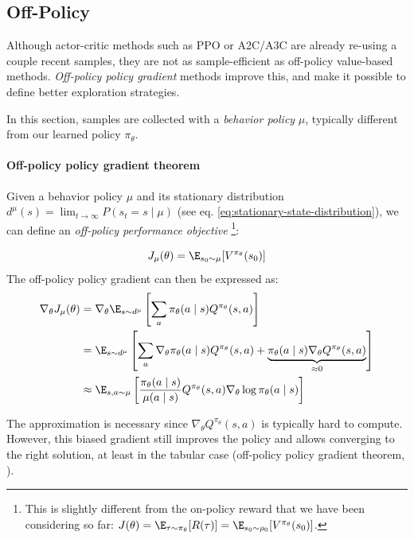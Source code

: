 \subsection{Off-Policy}
Although actor-critic methods such as PPO or A2C/A3C are already re-using a couple recent samples, they are not as sample-efficient as off-policy value-based methods. \emph{Off-policy policy gradient} methods improve this, and make it possible to define better exploration strategies.

In this section, samples are collected with a \emph{behavior policy} $\mu$, typically different from our learned policy $\pi_\theta$.

\paragraph{Off-policy policy gradient theorem}
Given a behavior policy $\mu$ and its stationary distribution $d^\mu(s) = \lim_{t\rightarrow \infty} P(s_t = s \mid \mu)$ (see eq. \ref{eq:stationary-state-distribution}), we can define an \emph{off-policy performance objective} \footnote{
This is slightly different from the on-policy reward that we have been considering so far: $J(\theta) = \E_{\tau \sim \pi_\theta}[R(\tau)] = \E_{s_0 \sim \rho_0}[V^{\pi_\theta}(s_0)]$.
}:

\[
    J_\mu(\theta) = \E_{s_0 \sim \mu}[V^{\pi_\theta}(s_0)]
\]
The off-policy policy gradient can then be expressed as:
\begin{align}
    \nabla_\theta J_\mu(\theta)
    &= \nabla_\theta \E_{s\sim d^\mu} \left[ \sum_a \pi_\theta(a\mid s) Q^{\pi_\theta}(s,a) \right] \nonumber \\
    &= \E_{s\sim d^\mu} \left[ 
        \sum_a \nabla_\theta \pi_\theta(a\mid s) Q^{\pi_\theta}(s,a) + 
        \underbrace{\pi_\theta(a\mid s) \nabla_\theta Q^{\pi_\theta}(s,a)}_{\approx 0}
    \right] \nonumber \\
    &\approx \E_{s,a \sim \mu} \left[
        \frac{\pi_\theta(a\mid s)}{\mu(a\mid s)} Q^{\pi_\theta}(s,a) \nabla_\theta \log \pi_\theta(a\mid s)
    \right]
    \label{eq:off-policy-policy-gradient}
\end{align}

The approximation is necessary since $\nabla_\theta Q^{\pi_\theta}(s,a)$ is typically hard to compute. However, this biased gradient still improves the policy and allows converging to the right solution, at least in the tabular case (off-policy policy gradient theorem, \cite{degris2012off}).

